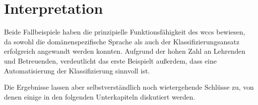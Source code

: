 \section{Interpretation}
    \label{section:findingsInterpretation}
    Beide Fallbeispiele haben die prinzipielle Funktionsfähigkeit des \gls{wccs} bewiesen,
    da sowohl die domänenspezifische Sprache als auch der Klassifizierungsansatz
    erfolgreich angewandt werden konnten.
    Aufgrund der hohen Zahl an Lehrenden und Betreuenden,
    verdeutlicht das erste Beispielt außerdem,
    dass eine Automatisierung der Klassifizierung sinnvoll ist.

    Die Ergebnisse lassen aber selbstverständlich noch wietergehende Schlüsse zu,
    von denen einige in den folgenden Unterkapiteln diskutiert werden.

    
    
    
    
    
